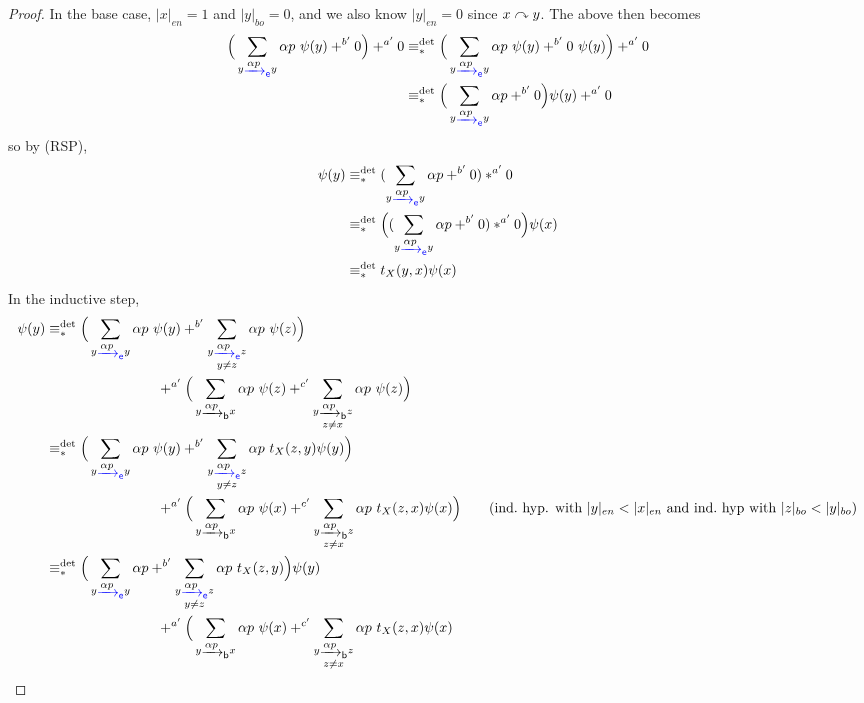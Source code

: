 \documentclass[orivec,envcountsect,envcountsame]{llncs}
\begin{document}
\begin{proof}
	In the base case, \(|x|_{en} = 1\) and \(|y|_{bo}=0\), and we also know \(|y|_{en}=0\) since \(x \mathrel{\curvearrowright} y\).
	The above then becomes
	\begin{align*}
		\Big(\sum_{y \etr{\alpha p} y} \alpha p ~\psi(y) +^{b'} 0\Big) +^{a'} 0
		&\equiv_*^{\det} \Big(\sum_{y \etr{\alpha p} y} \alpha p ~\psi(y) +^{b'} 0~\psi(y)\Big) +^{a'} 0 \\
		&\equiv_*^{\det} \Big(\sum_{y \etr{\alpha p} y} \alpha p +^{b'} 0\Big)\psi(y) +^{a'} 0
	\end{align*}
	so by (\textsf{RSP}),
    \begin{align*}
		\psi(y)
		&\equiv_*^{\det} (\sum_{y \etr{\alpha p} y} \alpha p +^{b'} 0) *^{a'} 0 \\
		&\equiv_*^{\det} \Big((\sum_{y \etr{\alpha p} y} \alpha p +^{b'} 0) *^{a'} 0\Big) \psi(x) \\
		&\equiv_*^{\det} t_X(y,x) \psi(x)
	\end{align*}
	In the inductive step,
	\begin{align*}
		\psi(y)
		&\equiv_*^{\det} \Big(
				\sum_{y \etr{\alpha p} y} \alpha p ~\psi(y)
				+^{b'} \sum_{\substack{y \etr{\alpha p} z\\y \neq z}} \alpha p ~\psi(z)
			\Big) \\ & \hspace{8em}+^{a'} \Big(
				\sum_{y \btr{\alpha p} x} \alpha p ~\psi(z)
				+^{c'} \sum_{\substack{y \btr{\alpha p} z\\z \neq x}} \alpha p ~\psi(z)
			\Big)\\
		&\equiv_*^{\det} \Big(
				\sum_{y \etr{\alpha p} y} \alpha p ~\psi(y) +^{b'} \sum_{\substack{y \etr{\alpha p} z\\y \neq z}} \alpha p ~t_X(z,y)\psi(y)
			\Big) \\ & \hspace{8em}+^{a'} \Big(
				\sum_{y \btr{\alpha p} x} \alpha p~\psi(x)
				+^{c'} \sum_{\substack{y \btr{\alpha p} z\\z \neq x}} \alpha p ~t_X(z,x)\psi(x)
			\Big)
			\tag{ind.~hyp. with \(|y|_{en} < |x|_{en}\) and ind.~hyp with \(|z|_{bo}<|y|_{bo}\)}\\
		&\equiv_*^{\det} \Big(
				\sum_{y \etr{\alpha p} y} \alpha p
				+^{b'} \sum_{\substack{y \etr{\alpha p} z\\y \neq z}} \alpha p ~t_X(z,y)
			\Big)\psi(y) \\ & \hspace{8em}+^{a'} \Big(
				\sum_{y \btr{\alpha p} x} \alpha p~\psi(x)
				+^{c'} \sum_{\substack{y \btr{\alpha p} z\\z \neq x}} \alpha p ~t_X(z,x)\psi(x)

\end{align*}
\end{proof}
\end{document}
